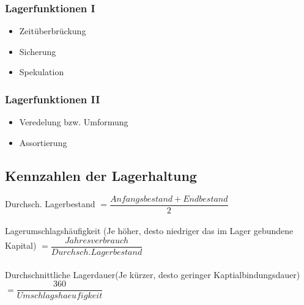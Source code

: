 \documentclass[../ZF_Wing.tex]{subfiles}
\begin{document}
\subsubsection{Lagerfunktionen I}
\begin{itemize}
	\item Zeitüberbrückung
	\item Sicherung
	\item Spekulation
\end{itemize}

\subsubsection{Lagerfunktionen II}
\begin{itemize}
	\item Veredelung bzw. Umformung
	\item Assortierung
\end{itemize}

\subsection{Kennzahlen der Lagerhaltung}

Durchsch. Lagerbestand $= \dfrac{Anfangsbestand + Endbestand}{2}$\\\\
Lagerumschlagshäufigkeit (Je höher, desto niedriger das im Lager gebundene Kapital) $= \dfrac{Jahresverbrauch}{Durchsch. Lagerbestand}$\\\\
Durchschnittliche Lagerdauer(Je kürzer, desto geringer Kaptialbindungsdauer) $= \dfrac{360}{Umschlagshaeufigkeit}$\\
\end{document}
